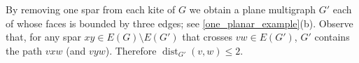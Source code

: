 \documentclass{patmorin}
\newcommand{\note}[2]{\noindent{\color{red}[#1:~#2]}}
\newcommand{\referee}[2]{\noindent\textcolor{blue}{\framebox{\begin{minipage}{\textwidth} Ref \#{#1}: #2\end{minipage}}}}
\DeclareMathOperator{\dist}{dist}
\renewcommand{\le}{\leqslant}
\begin{document}
%
%
%

By removing one spar from each kite of $G$ we obtain a plane multigraph $G'$ each of whose faces is bounded by three edges; see \cref{one_planar_example}(b).  Observe that, for any spar $xy\in E(G)\setminus E(G')$ that crosses $vw\in E(G')$, $G'$ contains the path $vxw$ (and $vyw$).  Therefore $\dist_{G'}(v,w)\le 2$.
\end{document}

